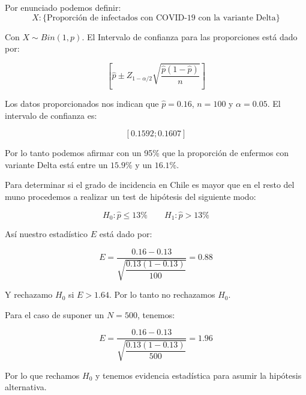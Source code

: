 \begin{solution}
Por enunciado podemos definir:
$$X :\{ \text{Proporción de infectados con COVID-19 con la variante Delta} \}$$

Con  $X \sim Bin(1,p)$. El Intervalo de confianza para las proporciones está dado por:

$$\left[ \widehat{p} \pm Z_{1-\alpha/2} \sqrt{\dfrac{\widehat{p}(1-\widehat{p})}{n}}\right]$$

Los datos proporcionados nos indican que $\widehat{p}= 0.16$, $n=100$ y $\alpha=0.05$. El intervalo de confianza es:

$$[0.1592; 0.1607]$$

Por lo tanto podemos afirmar con un 95\% que la proporción de enfermos con variante Delta está entre un $15.9\%$ y un $16.1\%$.

Para determinar si el grado de incidencia en Chile es mayor que en el resto del muno procedemos a realizar un test de hipótesis del siguiente modo:

$$H_0:\widehat{p} \leq 13\% \quad \quad   H_1: \widehat{p}>13\%$$

Así nuestro estadístico $E$ está dado por:

$$E = \dfrac{0.16-0.13}{\sqrt{\dfrac{0.13(1-0.13)}{100}}} =0.88 $$
 
Y rechazamo $H_0$ si $E>1.64$. Por lo tanto no rechazamos $H_0$.

Para el caso de suponer un $N=500$, tenemos:

$$E = \dfrac{0.16-0.13}{\sqrt{\dfrac{0.13(1-0.13)}{500}}} =1.96 $$

Por lo que rechamos $H_0$ y tenemos evidencia estadística para asumir la hipótesis alternativa.
\end{solution}